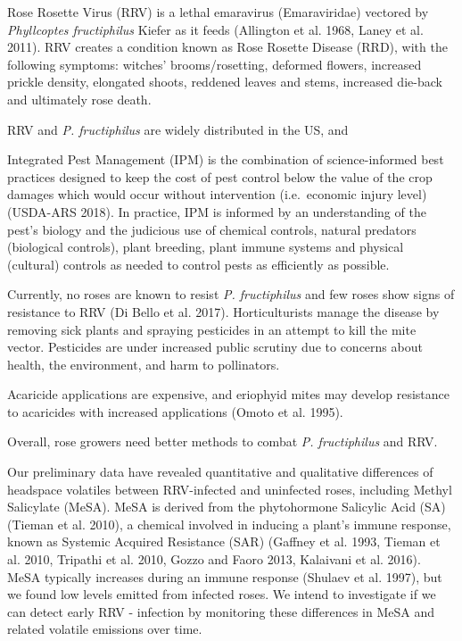 \documentclass[12pt,final,CPage]{ufthesis}
\begin{document}
{  Rose Rosette Virus (RRV) is a lethal emaravirus (Emaraviridae) vectored by \emph{Phyllcoptes fructiphilus} Kiefer as it feeds (Allington et al. 1968, Laney et al. 2011). RRV creates a condition known as Rose Rosette Disease (RRD), with the following symptoms: witches' brooms/rosetting, deformed flowers, increased prickle density, elongated shoots, reddened leaves and stems, increased die-back and ultimately rose death.

  RRV and \emph{P. fructiphilus} are widely distributed in the US, and

  Integrated Pest Management (IPM) is the combination of science-informed best practices designed to keep the cost of pest control below the value of the crop damages which would occur without intervention (i.e.~economic injury level) (USDA-ARS 2018). In practice, IPM is informed by an understanding of the pest's biology and the judicious use of chemical controls, natural predators (biological controls), plant breeding, plant immune systems and physical (cultural) controls as needed to control pests as efficiently as possible.

  Currently, no roses are known to resist \emph{P. fructiphilus} and few roses show signs of resistance to RRV (Di Bello et al. 2017). Horticulturists manage the disease by removing sick plants and spraying pesticides in an attempt to kill the mite vector. Pesticides are under increased public scrutiny due to concerns about health, the environment, and harm to pollinators.

  Acaricide applications are expensive, and eriophyid mites may develop resistance to acaricides with increased applications (Omoto et al. 1995).

  Overall, rose growers need better methods to combat \emph{P. fructiphilus} and RRV.

  Our preliminary data have revealed quantitative and qualitative differences of headspace volatiles between RRV-infected and uninfected roses, including Methyl Salicylate (MeSA). MeSA is derived from the phytohormone Salicylic Acid (SA) (Tieman et al. 2010), a chemical involved in inducing a plant's immune response, known as Systemic Acquired Resistance (SAR) (Gaffney et al. 1993, Tieman et al. 2010, Tripathi et al. 2010, Gozzo and Faoro 2013, Kalaivani et al. 2016). MeSA typically increases during an immune response (Shulaev et al. 1997), but we found low levels emitted from infected roses. We intend to investigate if we can detect early RRV - infection by monitoring these differences in MeSA and related volatile emissions over time.

}
\end{document}
